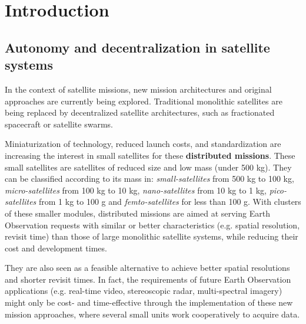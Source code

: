 
\chapter{Introduction} %

\label{Chapter1} %


\newcommand{\keyword}[1]{\textbf{#1}}
\newcommand{\tabhead}[1]{\textbf{#1}}
\newcommand{\code}[1]{\texttt{#1}}
\newcommand{\option}[1]{\texttt{\itshape#1}}

\section{Autonomy and decentralization in satellite systems}

In the context of satellite missions, new mission architectures and original approaches are currently being explored. Traditional monolithic satellites are being replaced by decentralized satellite architectures, such as fractionated spacecraft or satellite swarms.

Miniaturization of technology, reduced launch costs, and standardization are increasing the interest in small satellites for these \textbf{distributed missions}. These small satellites are satellites of reduced size and low mass (under 500 kg). They can be classified according to its mass in: \emph{small-satellites} from 500 kg to 100 kg, \emph{micro-satellites} 
from 100 kg to 10 kg, \emph{nano-satellites} from 10 kg to 1 kg, \emph{pico-satellites} from 1 kg to 100 g and \emph{femto-satellites} for less than 100 g. With clusters of these smaller modules, distributed missions are aimed at serving Earth Observation requests with similar or better characteristics (e.g. spatial resolution, revisit time) than those of large monolithic satellite systems, while reducing their cost and development times. 

They are also seen as a feasible alternative to achieve better spatial resolutions and shorter revisit times. In fact, the requirements of future Earth Observation applications (e.g. real-time video, stereoscopic radar, multi-spectral imagery) might only be cost- and time-effective through the implementation of these new mission approaches, where several small units work cooperatively to acquire data.

